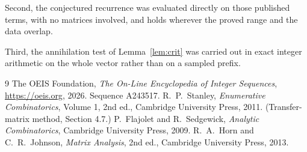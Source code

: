 \documentclass[11pt,a4paper]{article}
\theoremstyle{plain}
\theoremstyle{definition}
\begin{document}
Second, the conjectured recurrence was evaluated directly on those published terms, with no
matrices involved, and holds wherever the proved range and the data overlap.

Third, the annihilation test of Lemma~\ref{lem:crit} was carried out in exact integer
arithmetic on the whole vector rather than on a sampled prefix.

\begin{thebibliography}{9}
 The OEIS Foundation, \emph{The On-Line Encyclopedia of Integer
Sequences}, \url{https://oeis.org}, 2026. Sequence A243517.
 R.~P.~Stanley, \emph{Enumerative Combinatorics}, Volume 1, 2nd ed.,
Cambridge University Press, 2011. (Transfer-matrix method, Section 4.7.)
 P.~Flajolet and R.~Sedgewick, \emph{Analytic Combinatorics}, Cambridge
University Press, 2009.
 R.~A.~Horn and C.~R.~Johnson, \emph{Matrix Analysis}, 2nd ed., Cambridge
University Press, 2013.
\end{thebibliography}
\end{document}
